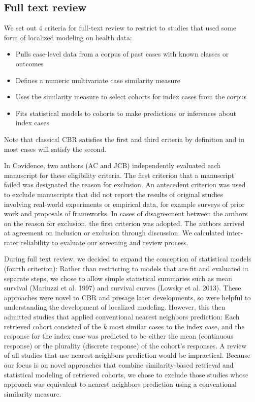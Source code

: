 \documentclass{article}
\providecommand{\tightlist}{%
  \setlength{\itemsep}{0pt}\setlength{\parskip}{0pt}}
\begin{document}
\hypertarget{full-text-review}{%
\subsection{Full text review}\label{full-text-review}}

We set out 4 criteria for full-text review to restrict to studies that
used some form of localized modeling on health data:

\begin{itemize}
\tightlist
\item
  Pulls case-level data from a corpus of past cases with known classes
  or outcomes
\item
  Defines a numeric multivariate case similarity measure
\item
  Uses the similarity measure to select cohorts for index cases from the
  corpus
\item
  Fits statistical models to cohorts to make predictions or inferences
  about index cases
\end{itemize}

Note that classical CBR satisfies the first and third criteria by
definition and in most cases will satisfy the second.

In Covidence, two authors (AC and JCB) independently evaluated each
manuscript for these eligibility criteria. The first criterion that a
manuscript failed was designated the reason for exclusion. An antecedent
criterion was used to exclude manuscripts that did not report the
results of original studies involving real-world experiments or
empirical data, for example surveys of prior work and proposals of
frameworks. In cases of disagreement between the authors on the reason
for exclusion, the first criterion was adopted. The authors arrived at
agreement on inclusion or exclusion through discussion. We calculated
inter-rater reliability to evaluate our screening and review process.

During full text review, we decided to expand the conception of
statistical models (fourth criterion): Rather than restricting to models
that are fit and evaluated in separate steps, we chose to allow simple
statistical summaries such as mean survival (Mariuzzi et al. 1997) and
survival curves (Lowsky et al. 2013). These approaches were novel to CBR
and presage later developments, so were helpful to understanding the
development of localized modeling. However, this then admitted studies
that applied conventional nearest neighbors prediction: Each retrieved
cohort consisted of the \(k\) most similar cases to the index case, and
the response for the index case was predicted to be either the mean
(continuous response) or the plurality (discrete response) of the
cohort's responses. A review of all studies that use nearest neighbors
prediction would be impractical. Because our focus is on novel
approaches that combine similarity-based retrieval and statistical
modeling of retrieved cohorts, we chose to exclude those studies whose
approach was equivalent to nearest neighbors prediction using a
conventional similarity measure.
\end{document}
